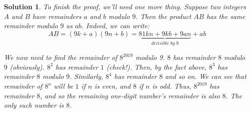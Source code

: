 \documentclass[a4paper,12pt]{article}
\theoremstyle{perfect}
\newtheorem{sol}{Solution}
\begin{document}
\begin{sol}
To finish the proof, we'll need one more thing. Suppose two integers $A$ and $B$ have remainders $a$ and $b$ modulo $9$. Then the product $AB$ has the same remainder modulo $9$ as $ab$. Indeed, we can write:
$$AB = (9k + a)(9n +b) = \underbrace{81kn + 9kb + 9an}_{divisible \; by \; 9} + ab$$


We now need to find the remainder of $8^{2019}$ modulo 9.
$8$ has remainder $8$ modulo $9$ (obviously). $8^2$ has remainder $1$ (check!). Then, by the fact above, $8^3$ has remainder $8$ modulo $9$. Similarly, $8^4$ has remainder $8$ and so on. We can see that remainder of $8^{n}$ will be $1$ if $n$ is even, and $8$ if $n$ is odd. Thus, $8^{2019}$ has remainder $8$, and so the remaining one-digit number's remainder is also $8$. The only such number is $8$.
\end{sol}
	
\end{document}
